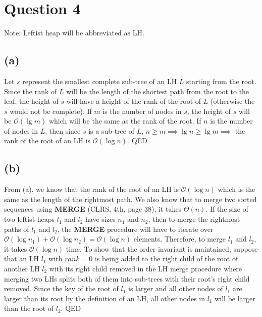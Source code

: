 \section{Question 4}
    Note: Leftist heap will be abbreviated as LH.
    \subsection{(a)}
    Let $s$ represent the smallest complete sub-tree of an LH $L$ starting from the root. Since the rank of $L$ will be the length of the shortest path from the root to the leaf, the height of $s$ will have a height of the rank of the root of $L$ (otherwise the $s$ would not be complete). If $m$ is the number of nodes in $s$, the height of $s$ will be $\mathcal{O}(\lg{m})$ which will be the same as the rank of the root. If $n$ is the number of nodes in $L$, then since $s$ is a sub-tree of $L$, $n \geq m \implies \lg{n} \geq \lg{m} \implies$ the rank of the root of an LH is $\mathcal{O}(\log{n})$. QED
    
    \subsection{(b)}
    From (a), we know that the rank of the root of an LH is $\mathcal{O}(\log{n})$ which is the same as the length of the rightmost path. We also know that to merge two sorted sequences using \textbf{MERGE} (CLRS, 4th, page 38), it takes $\Theta(n)$. If the size of two leftist heaps $l_1$ and $l_2$ have sizes $n_1$ and $n_2$, then to merge the rightmost paths of $l_1$ and $l_2$, the \textbf{MERGE} procedure will have to iterate over $\mathcal{O}(\log{n_1}) + \mathcal{O}(\log{n_2}) = \mathcal{O}(\log{n})$ elements. Therefore, to merge $l_1$ and $l_2$, it takes $\mathcal{O}(\log{n})$ time. To show that the order invariant is maintained, suppose that an LH $l_1$ with $rank = 0$ is being added to the right child of the root of another LH $l_2$ with its right child removed in the LH merge procedure where merging two LHs splits both of them into sub-trees with their root's right child removed. Since the key of the root of $l_1$ is larger and all other nodes of $l_1$ are larger than its root by the definition of an LH, all other nodes in $l_1$ will be larger than the root of $l_2$. 
    QED
    
